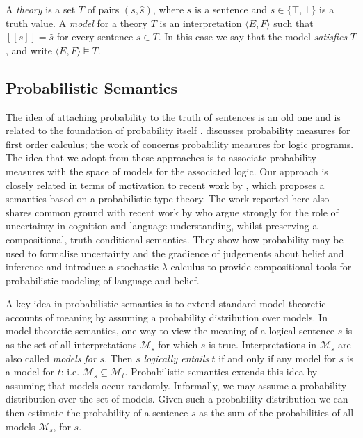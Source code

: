 \documentclass[11pt]{article}
\theoremstyle{definition}
\newcommand{\interp}[1]{[\![ #1 ]\!]}
\begin{document}
A \emph{theory} is a set $T$ of pairs $(s,\hat{s})$, where $s$ is a
sentence and $\hat{s}\in\{\top,\bot\}$ is a truth value. A
\emph{model} for a theory $T$ is an interpretation $\langle E,
F\rangle$ such that $\interp{s} = \hat{s}$ for every sentence $s\in
T$. In this case we say that the model \emph{satisfies} $T$, and write
$\langle E, F\rangle \models T$.

\subsection{Probabilistic Semantics}
 
The idea of attaching probability to the truth of sentences is an old
one and is related to the foundation of probability itself
\cite{Keynes:21,Los:55}.  discusses probability
measures for first order calculus; the work of 
concerns probability measures for logic programs. The idea that we adopt from these approaches is to associate
probability measures with the space of models for the associated
logic. Our approach is closely related in terms of motivation to recent work by , 
which proposes a semantics based on a probabilistic type theory.  The work reported here also shares common ground with recent work by  who argue strongly for the role of uncertainty in cognition and language understanding, whilst preserving a compositional, truth conditional semantics. They show how probability may be used to formalise uncertainty and the gradience of judgements about belief and inference and introduce a stochastic $\lambda$-calculus to provide compositional tools for probabilistic modeling of language and belief.



A key idea in probabilistic semantics is to extend standard
model-theoretic accounts of meaning by assuming a probability
distribution over models.  In model-theoretic semantics, one way to
view the meaning of a logical sentence $s$ is as the set of all
interpretations $\mathcal{M}_s$ for which $s$ is true. Interpretations
in $\mathcal{M}_s$ are also called {\em models for\/} $s$. Then $s$
{\em logically entails\/} $t$ if and only if any model for $s$ is a
model for $t$: i.e. $\mathcal{M}_s \subseteq
\mathcal{M}_t$. Probabilistic semantics extends this idea by assuming
that models occur randomly. Informally, we may assume a probability
distribution over the set of models. Given such a probability
distribution we can then estimate the probability of a sentence $s$ as
the sum of the probabilities of all models $\mathcal{M}_s$, for $s$.
\end{document}

